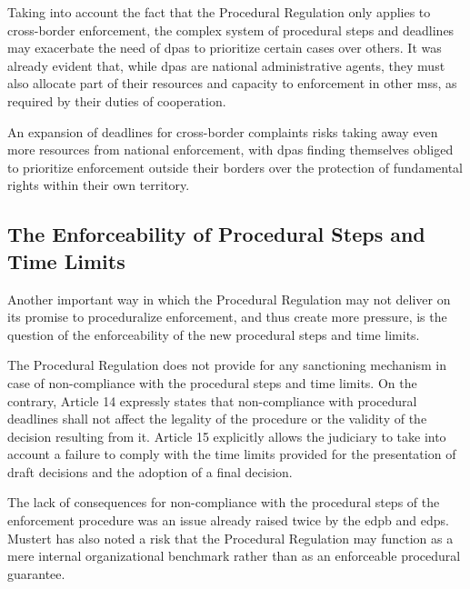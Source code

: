 Taking into account the fact that the Procedural Regulation only applies to cross-border enforcement, the complex system of procedural steps and deadlines may exacerbate the need of \glspl{dpa} to prioritize certain cases over others.
It was already evident that, while \glspl{dpa} are national administrative agents, they must also allocate part of their resources and capacity to enforcement in other \glspl{ms}, as required by their duties of cooperation.\autocites[343]{hijmansEUConsitutionalGuardian2016}[112]{mustertCrossborderEnforcementGDPR}

An expansion of deadlines for cross-border complaints risks taking away even more resources from national enforcement, with \glspl{dpa} finding themselves obliged to prioritize enforcement outside their borders over the protection of fundamental rights within their own territory.\autocite[112]{mustertCrossborderEnforcementGDPR}

\subsection{The Enforceability of Procedural Steps and Time Limits}
\label{sec:ch4-enforceability}

Another important way in which the Procedural Regulation may not deliver on its promise to proceduralize enforcement, and thus create more pressure, is the question of the enforceability of the new procedural steps and time limits.

The Procedural Regulation does not provide for any sanctioning mechanism in case of non-compliance with the procedural steps and time limits.
On the contrary, Article 14 expressly states that non-compliance with procedural deadlines shall not affect the legality of the procedure or the validity of the decision resulting from it.
Article 15 explicitly allows the judiciary to take into account a failure to comply with the time limits provided for the presentation of draft decisions and the adoption of a final decision.

The lack of consequences for non-compliance with the procedural steps of the enforcement procedure was an issue already raised twice by the \gls{edpb} and \gls{edps}.\autocites[para 50, see footnote 32]{edpbJointOpinion012023}[2.1]{EDPBLetterEUComm}
Mustert has also noted a risk that the Procedural Regulation may function as a mere internal organizational benchmark rather than as an enforceable procedural guarantee.\autocite[507]{mustertProceduralisingEnforcement2026}

